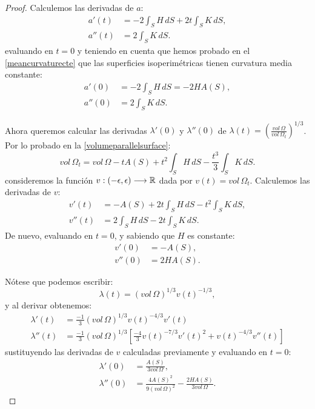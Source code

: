\begin{proof}
Calculemos las derivadas de $a$:
%
\begin{align*}
    a'(t) &= -2\int_{S} H \, dS + 2t\int_{S} K \, dS, \\
    a''(t) &= 2\int_{S} K \, dS.
\end{align*}
%
evaluando en $t=0$ y teniendo en cuenta que hemos probado en el \autoref{meancurvaturecte} que las superficies isoperimétricas tienen curvatura media constante:
%
\begin{align*}
    a'(0) &= -2\int_{S} H \, dS = -2HA(S), \\
    a''(0) &= 2\int_{S} K \, dS.
\end{align*}

Ahora queremos calcular las derivadas $\lambda'(0)$ y $\lambda''(0)$ de $\lambda(t) = \left( \frac{vol \, \Omega}{vol \, \Omega_t} \right) ^{1/3}$. Por lo probado en la \autoref{volumeparallelsurface}:
%
\begin{equation*}
    vol \, \Omega_t = vol \, \Omega - tA(S) + t^2\int_S H \, dS - \frac{t^3}{3}\int_S K \, dS.
\end{equation*}
%
consideremos la función $v: (-\epsilon, \epsilon) \longrightarrow \mathbb{R}$ dada por $v(t) = vol \, \Omega_t$. Calculemos las derivadas de $v$:
%
\begin{align*}
    v'(t) &= - A(S) + 2t\int_S H \, dS - t^2\int_S K \, dS, \\
    v''(t) &= 2\int_{S} H \, dS - 2t\int_S K \, dS.
\end{align*}
%
De nuevo, evaluando en $t=0$, y sabiendo que $H$ es constante:
%
\begin{align*}
    v'(0) &= -A(S), \\
    v''(0) &= 2HA(S).
\end{align*}

Nótese que podemos escribir:
%
\begin{equation*}
    \lambda(t) = (vol \, \Omega)^{1/3} v(t)^{-1/3},
\end{equation*}
%
y al derivar obtenemos:
%
\begin{align*}
    \lambda'(t) &= \frac{-1}{3} (vol \, \Omega)^{1/3} v(t)^{-4/3} v'(t) \\
    \lambda''(t) &= \frac{-1}{3} (vol \, \Omega)^{1/3} \left[ \frac{-4}{3}v(t)^{-7/3} v'(t)^2 + v(t)^{-4/3}v''(t) \right]
\end{align*}
%
sustituyendo las derivadas de $v$ calculadas previamente y evaluando en $t=0$:
%
\begin{align*}
    \lambda'(0) &= \frac{A(S)}{3 vol \, \Omega}, \\
    \lambda''(0) &= \frac{4 A(S)^2}{9 (vol \, \Omega)^{2}} - \frac{2HA(S)}{3 vol \, \Omega} .
\end{align*}


\end{proof}
